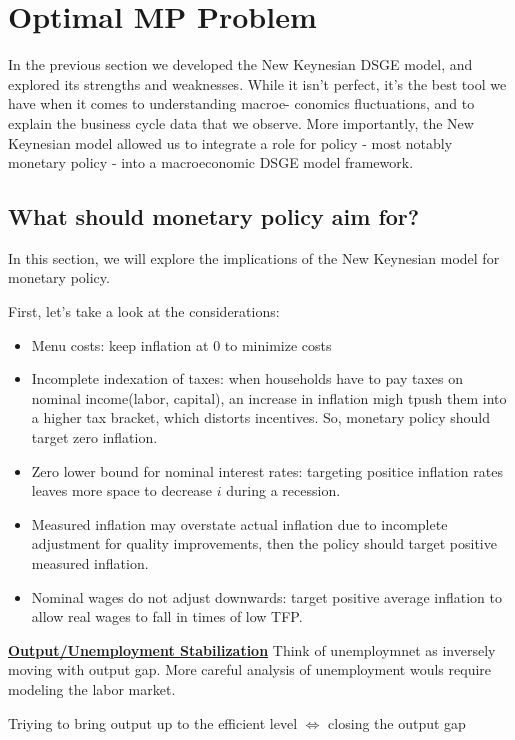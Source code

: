 \section{Optimal MP Problem}

In the previous section we developed the New Keynesian DSGE model, and explored its strengths and
weaknesses. While it isn't perfect, it's the best tool we have when it comes to understanding macroe-
conomics fluctuations, and to explain the business cycle data that we observe. More importantly, the
New Keynesian model allowed us to integrate a role for policy - most notably monetary policy - into
a macroeconomic DSGE model framework.

\subsection{What should monetary policy aim for?}

In this section, we will explore the implications of the New Keynesian model for monetary policy.

First, let's take a look at the considerations:

\begin{itemize}
    \item Menu costs: keep inflation at 0 to minimize costs
    \item Incomplete indexation of taxes: when households have to pay taxes on nominal income(labor, capital),
    an increase in inflation migh tpush them into a higher tax bracket, which distorts incentives. 
    So, monetary policy should target zero inflation.
    \item Zero lower bound for nominal interest rates: targeting positice inflation rates leaves more space to
    decrease $i$ during a recession.
    \item Measured inflation may overstate actual inflation due to
    incomplete adjustment for quality improvements, then the policy should target positive measured inflation.
    \item Nominal wages do not adjust downwards: target positive
    average inflation to allow real wages to fall in times of low TFP.
\end{itemize}

\underline{\textbf{Output/Unemployment Stabilization}}
Think of unemploymnet as inversely moving with output gap.
More careful analysis of unemployment wouls require modeling the labor market.

Triying to bring output up to the efficient level $\Leftrightarrow$ closing the output gap


